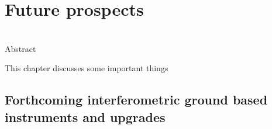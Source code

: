 \chapter{Future prospects}

\begin{bf}
  \author{Leon V. E. Koopmans (Kapteyn Astronomical Institute), Gianni Bernardi (INAF-IRA \& Rhodes University)}\\
  
Abstract\\
\end{bf}

This chapter discusses some important things

\section{Forthcoming interferometric ground based instruments and upgrades}

